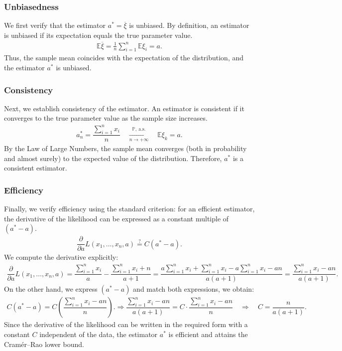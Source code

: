 \documentclass[final,3p,times,onecolumn]{elsarticle}
\begin{document}
\subsubsection{Unbiasedness}
We first verify that the estimator $a^* = \overline{\xi}$ is unbiased. 
By definition, an estimator is unbiased if its expectation equals the true parameter value.
\begin{gather*}
\mathbb{E}\overline{\xi} = \frac{1}{n} \sum_{i=1}^n \mathbb{E}\xi_i = a.
\end{gather*}
Thus, the sample mean coincides with the expectation of the distribution, and the estimator $a^*$ is unbiased.

\subsubsection{Consistency}
Next, we establish consistency of the estimator. An estimator is consistent if it converges to the true parameter value as the sample size increases.
\begin{gather*}
a^*_n = \dfrac{\sum\limits_{i = 1}^n x_i}{n} \quad 
\xrightarrow[n \to + \infty]{\mathbb{P}, \ \text{a.s.}} \quad \mathbb{E}\xi_k = a.
\end{gather*}
By the Law of Large Numbers, the sample mean converges (both in probability and almost surely) to the expected value of the distribution. Therefore, $a^*$ is a consistent estimator.

\subsubsection{Efficiency}
Finally, we verify efficiency using the standard criterion: 
for an efficient estimator, the derivative of the likelihood can be expressed as 
a constant multiple of $(a^* - a)$.
\begin{gather*}
\dfrac{\partial}{\partial a} L(x_1, \ldots, x_n, a) \stackrel{?}{=} C(a^* - a).
\end{gather*}
We compute the derivative explicitly:
\begin{gather*}
\dfrac{\partial}{\partial a} L(x_1, \ldots, x_n, a) = 
\dfrac{\sum\limits_{i = 1}^n x_i}{a} - \dfrac{\sum\limits_{i = 1}^n x_i + n}{a + 1} 
= \dfrac{a\sum\limits_{i = 1}^n x_i + \sum\limits_{i = 1}^n x_i - a \sum\limits_{i = 1}^n x_i - an}{a(a+1)} 
= \dfrac{ \sum\limits_{i = 1}^n x_i - an}{a(a+1)}.
\end{gather*}
On the other hand, we express $(a^* - a)$ and match both expressions, we obtain:
\begin{gather*}
C(a^* - a) = C\left(\dfrac{\sum\limits_{i = 1}^n x_i - an}{n} \right). 
\Longrightarrow
\dfrac{ \sum\limits_{i = 1}^n x_i - an}{a(a+1)} = 
C \cdot \dfrac{\sum\limits_{i = 1}^n x_i - an}{n}
\quad \Longrightarrow \quad 
C = \dfrac{n}{a(a + 1)}.
\end{gather*}
Since the derivative of the likelihood can be written in the required form with a constant $C$ independent of the data, the estimator $a^*$ is efficient and attains the Cramér--Rao lower bound.
\end{document}
